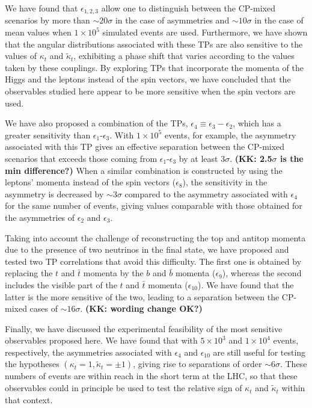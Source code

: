 \documentclass[aps,preprint,tightenlines,floatfix,superscriptaddress,nofootinbib,showpacs]{revtex4-1}
\def\tbar{\bar{t}}
\def\bbar{\bar{b}}
\def\kp{\kappa_t}
\def\kpt{\tilde{\kappa}_t}
\begin{document}
We have found
that $\epsilon_{1,2,3}$ allow one to distinguish between the
$\mathrm{CP}$-mixed scenarios by more than $\sim 20\sigma$ in the
case of asymmetries and $\sim 10\sigma$ in the case of mean values
when $1 \times 10^5$ simulated events are used. Furthermore, we have
shown that the angular distributions associated with these TPs are
also sensitive to the values of $\kp$ and $\kpt$, exhibiting a phase
shift that varies according to the values taken by these couplings.
By exploring TPs that incorporate the momenta of the
Higgs and the leptons instead of the spin vectors, we have concluded that
the observables studied here appear to be more sensitive when the spin
vectors are used.\par

We have also proposed a combination of the TPs,
$\epsilon_4\equiv \epsilon_3-\epsilon_2$,
which has a greater sensitivity than $\epsilon_1$-$\epsilon_3$.
With $1\times 10^5$ events, for example, the asymmetry associated
with this TP gives an effective separation 
between the $\mathrm{CP}$-mixed scenarios that
exceeds those coming from $\epsilon_1$-$\epsilon_3$
by at least $3\sigma$. {\bf (KK: 2.5$\sigma$ is the min difference?)}   
When a similar
combination is constructed by using the leptons' momenta instead of the
spin vectors ($\epsilon_8$), the sensitivity in the asymmetry is
decreased by $\sim 3\sigma$ compared to the asymmetry associated
with $\epsilon_4$ for
the same number of events, giving values comparable with those
obtained for the asymmetries of $\epsilon_2$ and $\epsilon_3$. \par

Taking into account the challenge of reconstructing the top and
antitop momenta due to the presence of two neutrinos in the final
state, we have proposed and tested two TP correlations that avoid this
difficulty. The first one is obtained by replacing the $t$ and $\tbar$
momenta by the $b$ and $\bbar$ momenta ($\epsilon_9$), whereas the second
includes the visible part of the $t$ and $\tbar$ momenta
($\epsilon_{10}$). We have found that the latter is the more
sensitive of the two,
leading to a separation between the $\mathrm{CP}$-mixed cases
of $\sim 16\sigma$. {\bf (KK: wording change OK?)}\par

Finally, we have discussed the experimental 
feasibility of the most sensitive
observables proposed here. We have found that with $5\times 10^3$ and
$1\times 10^4$ events, respectively, the asymmetries
associated with $\epsilon_4$ and $\epsilon_{10}$ are still
useful for testing the hypotheses $(\kp=1,\kpt=\pm 1)$, giving rise to
separations of order $\sim 6\sigma$. These numbers of events
are within reach in the short term at the LHC,
so that these observables could in principle be used
to test the relative sign of $\kp$ and $\kpt$ within that context.
\end{document}

